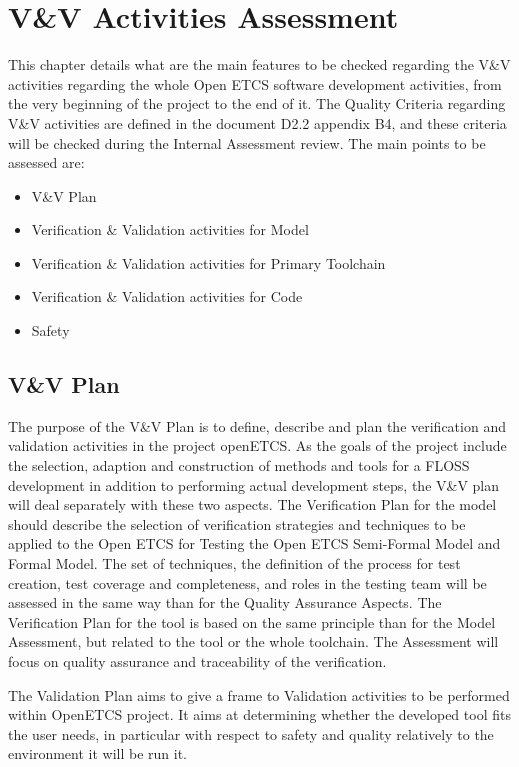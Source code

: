 \documentclass{template/openetcs_report}
\begin{document}
\chapter{V\&V Activities Assessment}
This chapter details what are the main features to be checked regarding the V\&V activities regarding the whole Open ETCS software development activities, from the very beginning of the project to the end of it.
The Quality Criteria regarding V\&V activities are defined in the document D2.2 appendix B4, and these criteria will be checked during the Internal Assessment review. The main points to be assessed are:
\begin{itemize}
\item V\&V Plan
\item Verification \& Validation activities for Model
\item Verification \& Validation activities for Primary Toolchain
\item Verification \& Validation activities for Code
\item Safety
\end{itemize}

\section{V\&V Plan}
The purpose of the V\&V Plan is to define, describe and plan the verification and validation activities in the project openETCS. As the goals of the project include the selection, adaption and construction of methods and tools for a FLOSS development in addition to performing actual development steps, the V\&V plan will deal separately with these two aspects.
The Verification Plan for the model should describe the selection of verification strategies and techniques to be applied to the Open ETCS for Testing the Open ETCS Semi-Formal Model and Formal Model. The set of techniques, the definition of the process for test creation, test coverage and completeness, and roles in the testing team will be assessed in the same way than for the Quality Assurance Aspects.
The Verification Plan for the tool is based on the same principle than for the Model Assessment, but related to the tool or the whole toolchain. The Assessment will focus on quality assurance and traceability of the verification.

The Validation Plan aims to give a frame to Validation activities to be performed within OpenETCS project. It aims at determining whether the developed tool fits the user needs, in particular with respect to safety and quality relatively to the environment it will be run it.
\end{document}
